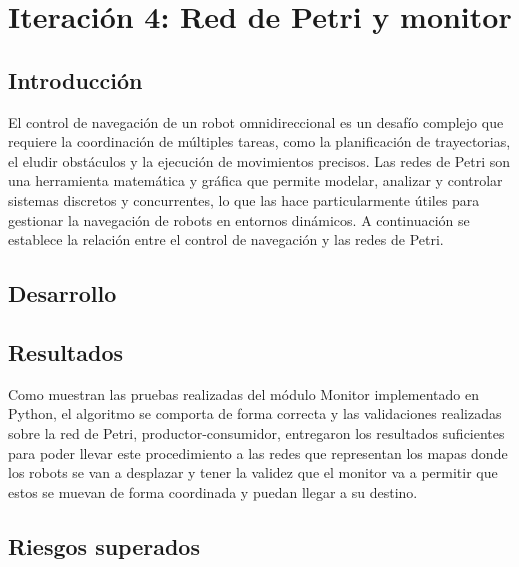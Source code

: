 \newpage
\section{Iteración 4: Red de Petri y monitor}

\subsection{Introducción}
El control de navegación de un robot omnidireccional es un desafío complejo que requiere la coordinación de múltiples tareas, como la planificación de trayectorias, el eludir obstáculos y la ejecución de movimientos precisos. Las redes de Petri son una herramienta matemática y gráfica que permite modelar, analizar y controlar sistemas discretos y concurrentes, lo que las hace particularmente útiles para gestionar la navegación de robots en entornos dinámicos. A continuación se establece la relación entre el control de navegación y las redes de Petri.



\subsection{Desarrollo}









\subsection{Resultados}
Como muestran las pruebas realizadas del módulo Monitor implementado en Python, el algoritmo se comporta de forma correcta y las validaciones realizadas sobre la red de Petri, productor-consumidor, entregaron los resultados suficientes para poder llevar este procedimiento a las redes que representan los mapas donde los robots se van a desplazar y tener la validez que el monitor va a permitir que estos se muevan de forma coordinada y puedan llegar a su destino.\\

\subsection{Riesgos superados}

